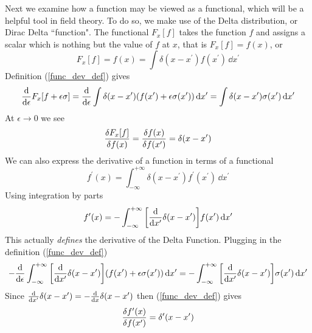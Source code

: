 Next we examine how a function may be viewed as a functional, which will be a helpful tool in field theory. To do so, we make use of the Delta distribution, or Dirac Delta ``function". The functional $F_x[f]$ takes the function $f$ and assigns a scalar which is nothing but the value  of $f$ at $x$, that is $F_x[f]=f(x)$, or
\begin{equation}
    F_x[f]=f(x)=\int\delta(x-x^\prime)f(x^\prime)\,\dd x^\prime
    \label{delta_functional}
\end{equation}
Definition (\ref{func_dev_def}) gives 
\begin{equation}
    \dv{\epsilon}F_x[f+\epsilon\sigma]=\dv{\epsilon}\int\delta(x-x^\prime)(f(x^\prime)+\epsilon\sigma(x^\prime))\,\dd x^\prime=\int\delta(x-x^\prime)\sigma(x^\prime)\,\dd x^\prime
\end{equation}
At $\epsilon\to0$ we see
\begin{equation}
    \fdv{F_x[f]}{f(x)}=\fdv{f(x)}{f(x^\prime)}=\delta(x-x^\prime)
    \label{ex2_func_der}
\end{equation}
We can also express the derivative of a function in terms of a functional
\begin{equation}
    f^\prime(x)=\int_{-\infty}^{+\infty}\delta(x-x^\prime)f^\prime(x^\prime)\,\dd x^\prime
\end{equation}
Using integration by parts
\begin{equation}
    f^\prime(x)=-\int_{-\infty}^{+\infty}\qty[\dv{x^\prime}\delta(x-x^\prime)]f(x^\prime)\,\dd x^\prime
\end{equation}
This actually \textit{defines} the derivative of the Delta Function. Plugging in the definition (\ref{func_dev_def})
\begin{equation}
    -\dv{\epsilon}\int_{-\infty}^{+\infty}\qty[\dv{x^\prime}\delta(x-x^\prime)]\qty(f(x^\prime)+\epsilon\sigma(x^\prime))\,\dd x^\prime=-\int_{-\infty}^{+\infty}\qty[\dv{x^\prime}\delta(x-x^\prime)]\sigma(x^\prime)\,\dd x^\prime
\end{equation}
Since $\dv{x^\prime}\delta(x-x^\prime)=-\dv{x}\delta(x-x^\prime)$ then (\ref{func_dev_def}) gives 
\begin{equation}
    \fdv{f^\prime(x)}{f(x^\prime)}=\delta^\prime(x-x^\prime)
\end{equation}

